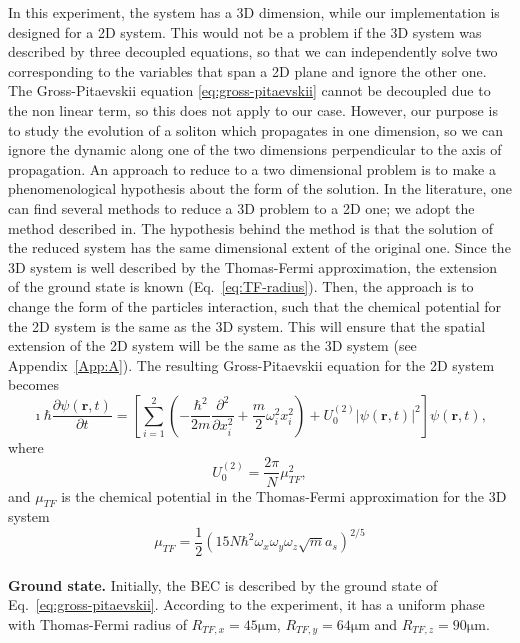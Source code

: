 In this experiment, the system has a 3D dimension, while our implementation is designed for a 2D system. This would not be a problem if the 3D system was described by three decoupled equations, so that we can independently solve two corresponding to the variables that span a 2D plane and ignore the other one. The Gross-Pitaevskii equation \eqref{eq:gross-pitaevskii} cannot be decoupled due to the non linear term, so this does not apply to our case. However, our purpose is to study the evolution of a soliton which propagates in one dimension, so we can ignore the dynamic along one of the two dimensions perpendicular to the axis of propagation. An approach to reduce to a two dimensional problem is to make a phenomenological hypothesis about the form of the solution. In the literature, one can find several methods to reduce a 3D problem to a 2D one; we adopt the method described in.
The hypothesis behind the method is that the solution of the reduced system has the same dimensional extent of the original one. Since the 3D system is well described by the Thomas-Fermi approximation, the extension of the ground state is known (Eq.~\eqref{eq:TF-radius}). Then, the approach is to change the form of the particles interaction, such that the chemical potential for the 2D system is the same as the 3D system. This will ensure that the spatial extension of the 2D system will be the same as the 3D system (see Appendix~\ref{App:A}). 
The resulting Gross-Pitaevskii equation for the 2D system becomes
\begin{equation} \label{eq:gross-pitaevskii-simulation}
\imath \hbar \frac{\partial \psi(\textbf{r}, t)}{\partial t} = \left[ \sum_{i=1}^2 \left( -\frac{\hbar^2}{2m} \frac{\partial^2}{\partial x_i^2} + \frac{m}{2} \omega_i^2 x_i^2 \right) + U_0^{(2)} |\psi(\textbf{r}, t)|^2 \right] \psi(\textbf{r}, t),
\end{equation}
where
\begin{equation}
U_0^{(2)} = \frac{2\pi}{N} \mu_{TF}^2 ,
\end{equation}
and $\mu_{TF}$ is the chemical potential in the Thomas-Fermi approximation for the 3D system
\begin{equation}
\mu_{TF} = \frac{1}{2} \left( 15 N \hbar^2 \omega_x \omega_y \omega_z \sqrt{m} a_s \right)^{2/5}
\end{equation}
\\
\noindent \textbf{Ground state.} Initially, the BEC is described by the ground state  of Eq.~\eqref{eq:gross-pitaevskii}. According to the experiment, it has a uniform phase with Thomas-Fermi radius of $R_{TF, x} = 45 \mathrm{\mu m}$, $R_{TF, y} = 64 \mathrm{\mu m}$ and $R_{TF, z} = 90 \mathrm{\mu m}$.
